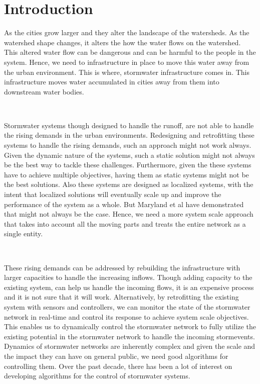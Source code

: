 \chapter{Introduction}\label{ch:introduction}
As the cities grow larger and they alter the landscape of the watersheds.
As the watershed shape changes, it alters the how the water flows on the watershed.
This altered water flow can be dangerous and can be harmful to the people in the system.
Hence, we need to infrastructure in place to move this water away from the urban environment.
This is where, stormwater infrastructure comes in.
This infrastructure moves water accumulated in cities away from them into downstream water bodies.

\

Stormwater systems though designed to handle the runoff, are not able to handle the rising demands in the urban environments. 
Redesigning and retrofitting these systems to handle the rising demands, such an approach might not work always. 
Given the dynamic nature of the systems, such a static solution might not always be the best way to tackle these challenges. 
Furthermore, given the these systems have to achieve multiple objectives, having them as static systems might not be the best solutions. 
Also these systems are designed as localized systems, with the intent that localized solutions will eventually scale up and improve the performance of the system as a whole.
But Maryland et al have demonstrated that might not always be the case. 
Hence, we need a more system scale approach that takes into account all the moving parts and treats the entire network as a single entity. 

\

These rising demands can be addressed by rebuilding the infrastructure with larger capacities to handle the increasing inflows. 
Though adding capacity to the existing system, can help us handle the incoming flows, it is an expensive process and it is not sure that it will work.
Alternatively, by retrofitting the existing system with sensors and controllers, we can monitor the state of the stormwater network in real-time and control its response to achieve system scale objectives.
This enables us to dynamically control the stormwater network to fully utilize the existing potential in the stormwater network to handle the incoming stormevents. 
Dynamics of stormwater networks are inherently complex and given the scale and the impact they can have on general public, we need good algorithms for controlling them.
Over the past decade, there has been a lot of interest on developing algorithms for the control of stormwater systems.


